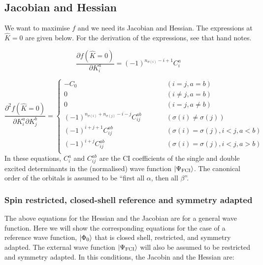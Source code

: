 \subsection{Jacobian and Hessian}

We want to maximise $f$ and we need its Jacobian and Hessian.
The expressions at $\hat{K} = 0$ are given below.
For the derivation of the expressions, see that hand notes.

\begin{equation}
  \frac{\partial f(\hat{K} = 0)}{\partial K_i^a} = (-1)^{n_{\sigma(i)} - i + 1} C_i^a
\end{equation}

\begin{equation}
  \frac{\partial^2 f(\hat{K} = 0)}{\partial K_i^a \partial K_j^b} =
  \left\{
    \begin{array}{lcr}
      -C_0 & \quad\quad & (i = j, a = b)\\
      0   &  \quad\quad & (i \ne j, a = b)\\
      0   &  \quad\quad & (i = j, a \ne b)\\
      (-1)^{n_{\sigma(i)}+n_{\sigma(j)}-i-j}C_{ij}^{ab} & \quad\quad & (\sigma(i) \ne \sigma(j))\\
      (-1)^{i+j+1}C_{ij}^{ab} & \quad\quad & (\sigma(i) = \sigma(j), i<j, a<b)\\
      (-1)^{i+j}C_{ij}^{ab} & \quad\quad & (\sigma(i) = \sigma(j), i<j, a>b)\\
    \end{array}
  \right.
\end{equation}
In these equations, $C_i^a$ and $C_{ij}^{ab}$ are the CI coefficients of the single and double excited determinants in the (normalised) wave function $\ket{\Psi_\text{FCI}}$.
The canonical order of the orbitals is assumed to be ``first all $\alpha$, then all $\beta$''.

\subsubsection{Spin restricted, closed-shell reference and symmetry adapted}

The above equations for the Hessian and the Jacobian are for a general wave function.
Here we will show the corresponding equations for the case of a reference wave function, $\ket{\Phi_0}$ that is closed shell, restricted, and symmetry adapted.
The external wave function $\ket{\Psi_\text{FCI}}$ will also be assumed to be restricted and symmetry adapted.
In this conditions, the Jacobin and the Hessian are:

